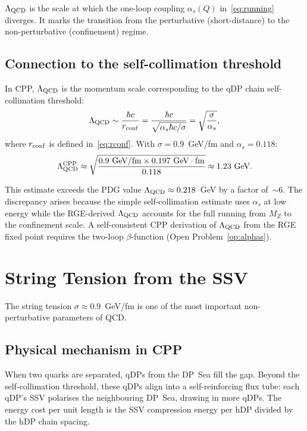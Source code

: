\documentclass[11pt,a4paper]{article}
\newcommand{\as}{\alpha_s}
\begin{document}
$\Lambda_{\rm QCD}$ is the scale at which the one-loop coupling
$\as(Q)$ in~\eqref{eq:running} diverges.  It marks the transition
from the perturbative (short-distance) to the non-perturbative
(confinement) regime.

\subsection{Connection to the self-collimation threshold}

In CPP, $\Lambda_{\rm QCD}$ is the momentum scale corresponding
to the qDP chain self-collimation threshold:
\begin{equation}
\Lambda_{\rm QCD} \sim \frac{\hbar c}{r_{\rm conf}}
= \frac{\hbar c}{\sqrt{\as\hbar c/\sigma}}
= \sqrt{\frac{\sigma}{\as}},
\label{eq:lambda_cpp}
\end{equation}
where $r_{\rm conf}$ is defined in~\eqref{eq:rconf}.  With
$\sigma = 0.9$~GeV/fm and $\as = 0.118$:
\begin{equation}
\Lambda_{\rm QCD}^{\rm CPP} \approx
\sqrt{\frac{0.9\ \text{GeV/fm} \times 0.197\ \text{GeV}\cdot\text{fm}}{0.118}}
\approx 1.23\ \text{GeV}.
\label{eq:lambda_num}
\end{equation}

This estimate exceeds the PDG value $\Lambda_{\rm QCD}
\approx 0.218$~GeV by a factor of~$\sim6$.  The discrepancy
arises because the simple self-collimation estimate uses
$\as$ at low energy while the RGE-derived $\Lambda_{\rm QCD}$
accounts for the full running from $M_Z$ to the confinement
scale.  A self-consistent CPP derivation of $\Lambda_{\rm QCD}$
from the RGE fixed point requires the two-loop $\beta$-function
(Open Problem~\ref{op:alphas}).

\section{String Tension from the SSV}
\label{sec:sigma}

The string tension $\sigma \approx 0.9$~GeV/fm is one of the
most important non-perturbative parameters of QCD.

\subsection{Physical mechanism in CPP}

When two quarks are separated, qDPs from the DP~Sea fill the gap.
Beyond the self-collimation threshold, these qDPs align into a
self-reinforcing flux tube: each qDP's SSV polarises the
neighbouring DP~Sea, drawing in more qDPs.  The energy cost per
unit length is the SSV compression energy per hDP divided by the
hDP chain spacing.
\end{document}
